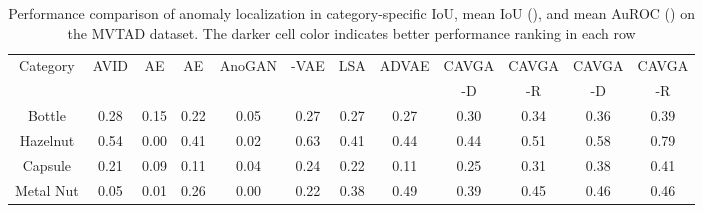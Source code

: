 \documentclass[runningheads]{llncs}
\begin{document}
\begin{table}[t]
\begin{center}
\renewcommand{\arraystretch}{.9}
\setlength{\tabcolsep}{1.0pt}
\caption{Performance comparison of anomaly localization in category-specific IoU, mean IoU (), and mean AuROC () on the MVTAD dataset. The darker cell color indicates better performance ranking in each row} 
\label{table_iou_mvtec}
\scriptsize
\begin{tabular}{cccccccccccc}
\toprule
		Category &AVID &AE &AE &AnoGAN &-VAE &LSA &ADVAE  &CAVGA &CAVGA &CAVGA &CAVGA\\
		&\cite{sabokrou2018avid} &\cite{bergmann2018improving} &\cite{bergmann2018improving} &\cite{schlegl2017unsupervised} &\cite{dehaene2020iterative} &\cite{abati2019latent} &\cite{liu2019towards}    &-D &-R &-D &-R\\
\midrule
		Bottle   &\cellcolor{blue!40}0.28 &\cellcolor{blue!20}0.15  &\cellcolor{blue!25}0.22 &\cellcolor{blue!10}0.05 &\cellcolor{blue!30}0.27 &\cellcolor{blue!30}0.27    &\cellcolor{blue!30}0.27  &\cellcolor{blue!50}0.30  &\cellcolor{blue!60}0.34   &\cellcolor{blue!70}0.36 &\cellcolor{blue!80}\color{white}0.39\\
Hazelnut  &\cellcolor{blue!50}0.54 &\cellcolor{blue!10}0.00  &\cellcolor{blue!20}0.41 &\cellcolor{blue!15}0.02 &\cellcolor{blue!70}0.63 &\cellcolor{blue!20}0.41    &\cellcolor{blue!30}0.44  &\cellcolor{blue!30}0.44 &\cellcolor{blue!40}0.51 &\cellcolor{blue!60}0.58 &\cellcolor{blue!80}\color{white}0.79 \\
Capsule   &\cellcolor{blue!25}0.21 &\cellcolor{blue!10}0.09  &\cellcolor{blue!20}0.11 &\cellcolor{blue!5}0.04 &\cellcolor{blue!40}0.24 &\cellcolor{blue!30}0.22   &\cellcolor{blue!20}0.11  &\cellcolor{blue!50}0.25  &\cellcolor{blue!60}0.31 &\cellcolor{blue!70}0.38 &\cellcolor{blue!80}\color{white}0.41\\
Metal Nut &\cellcolor{blue!15}0.05 &\cellcolor{blue!10}0.01  &\cellcolor{blue!30}0.26 &\cellcolor{blue!5}0.00 &\cellcolor{blue!25}0.22 &\cellcolor{blue!40}0.38    &\cellcolor{blue!80}\color{white}0.49  &\cellcolor{blue!50}0.39  &\cellcolor{blue!60}0.45  &\cellcolor{blue!70}0.46 &\cellcolor{blue!70}0.46\\
		

\end{tabular}
\end{center}
\end{table}
\end{document}
